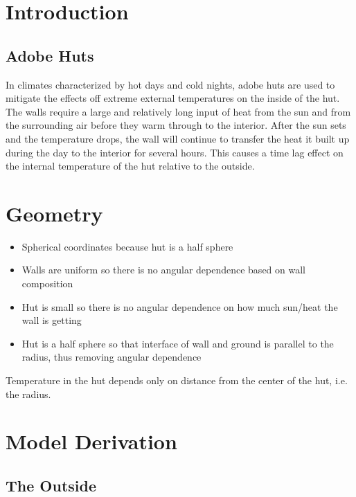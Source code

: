 \documentclass{article}
\begin{document}
\pagestyle{fancy}
\fancyhead{}


\tableofcontents

\section{Introduction}

\subsection{Adobe Huts}

In climates characterized by hot days and cold nights, adobe huts are used to mitigate the effects off extreme external temperatures on the inside of the hut. The walls require a large and relatively long input of heat from the sun and from the surrounding air before they warm through to the interior. After the sun sets and the temperature drops, the wall will continue to transfer the heat it built up during the day to the interior for several hours. This causes a time lag effect on the internal temperature of the hut relative to the outside.

\section{Geometry}

\begin{itemize}
    \item Spherical coordinates because hut is a half sphere
    \item Walls are uniform so there is no angular dependence based on wall composition
    \item Hut is small so there is no angular dependence on how much sun/heat the wall is getting
    \item Hut is a half sphere so that interface of wall and ground is parallel to the radius, thus removing angular dependence
\end{itemize}

Temperature in the hut depends only on distance from the center of the hut, i.e. the radius.

\section{Model Derivation}

\subsection{The Outside}
\end{document}
